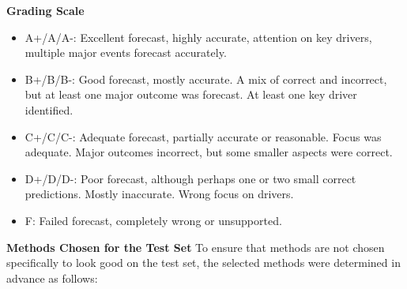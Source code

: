 \documentclass[12pt,a4paper]{article}
\begin{document}
\textbf{Grading Scale}
\begin{itemize}[noitemsep,topsep=0pt]
\item A+/A/A-: Excellent forecast, highly accurate, attention on key drivers, multiple major events forecast accurately.
\item B+/B/B-: Good forecast, mostly accurate. A mix of correct and incorrect, but at least one major outcome was forecast. At least one key driver identified.
\item C+/C/C-: Adequate forecast, partially accurate or reasonable. Focus was adequate. Major outcomes incorrect, but some smaller aspects were correct.
\item D+/D/D-: Poor forecast, although perhaps one or two small correct predictions. Mostly inaccurate. Wrong focus on drivers.
\item F: Failed forecast, completely wrong or unsupported.
\end{itemize}

\textbf{Methods Chosen for the Test Set} To ensure that methods are not chosen specifically to look good on the test set, the selected methods were determined in advance as follows:
\end{document}
